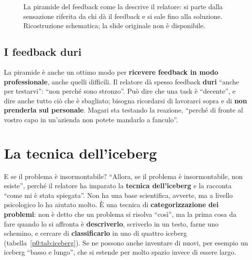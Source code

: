 \begin{figure}[htbp]
\centering
{}
\caption{La piramide del feedback come la descrive il relatore: si parte
dalla sensazione riferita da chi dà il feedback e si sale fino alla
soluzione. Ricostruzione schematica; la slide originale non è
disponibile.}
\label{p0:fig:piramide}
\end{figure}

\subsection{I feedback duri}

La piramide è anche un ottimo modo per \textbf{ricevere feedback in modo
professionale}, anche quelli difficili. Il relatore dà spesso feedback
\textbf{duri} ``anche per testarvi'': ``non perché sono stronzo''. Può dire
che una task è ``decente'', e dire anche tutto ciò che è sbagliato;
bisogna ricordarsi di lavorarci sopra e di \textbf{non prenderla sul
personale}. Magari sta testando la reazione, ``perché di fronte al vostro
capo in un'azienda non potete mandarlo a fanculo''.

\section{La tecnica dell'iceberg}
\label{p0:sec:iceberg}

E se il problema è insormontabile? ``Allora, se il problema è
insormontabile, non esiste'', perché il relatore ha imparato la
\textbf{tecnica dell'iceberg} e la racconta ``come mi è stata spiegata''.
Non ha una base scientifica, avverte, ma a livello psicologico lo ha
aiutato molto. È una tecnica di \textbf{categorizzazione dei problemi}: non
è detto che un problema si risolva ``così'', ma la prima cosa da fare quando
lo si affronta è \textbf{descriverlo}, scriverlo in un testo, farne uno
schemino, e cercare di \textbf{classificarlo} in uno di quattro iceberg
(tabella~\ref{p0:tab:iceberg}). Se ne possono anche inventare di nuovi, per
esempio un iceberg ``basso e lungo'', che si estende per molto spazio invece
di essere largo.


